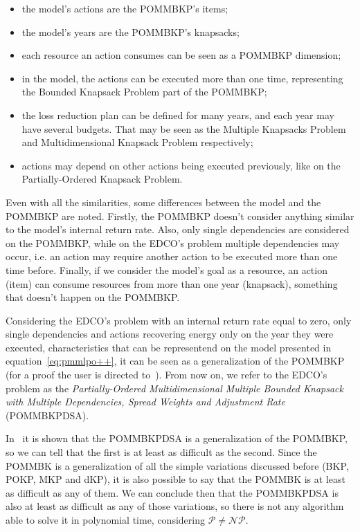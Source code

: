 \begin{itemize}
  \item the model's actions are the POMMBKP's items;
  \item the model's years are the POMMBKP's knapsacks;
  \item each resource an action consumes can be seen as a POMMBKP dimension;
  \item in the model, the actions can be executed more than one time, representing the Bounded Knapsack Problem part of the POMMBKP;
  \item the loss reduction plan can be defined for many years, and each year may have several budgets. That may be seen as the Multiple Knapsacks Problem and Multidimensional Knapsack Problem respectively;
  \item actions may depend on other actions being executed previously, like on the Partially-Ordered Knapsack Problem.
\end{itemize}

Even with all the similarities, some differences between the model and the POMMBKP are noted. Firstly, the 
POMMBKP doesn't consider anything similar to the model's internal return rate. Also, only single dependencies
are considered on the POMMBKP, while on the EDCO's problem multiple dependencies may occur, i.e. an action may require
another action to be executed more than one time before. Finally, if we consider the model's goal as a resource, 
an action (item) can consume resources from more than one year (knapsack), something that doesn't happen on the POMMBKP.

Considering the EDCO's problem with an internal return rate equal to zero, only single dependencies and actions recovering energy 
only on the year they were executed, characteristics that can be representend on the model presented in equation~\ref{eq:pmmlpo++}, 
it can be seen as a generalization of the POMMBKP (for a proof the user is directed to~\cite{Moreira2015}). From now on, we refer to 
the EDCO's problem as the \textit{Partially-Ordered Multidimensional Multiple Bounded Knapsack with Multiple Dependencies, 
Spread Weights and Adjustment Rate} (POMMBKPDSA).

In~\cite{Moreira2015} it is shown that the POMMBKPDSA is a generalization of the POMMBKP, so we can tell 
that the first is at least as difficult as the second. Since the POMMBK is a generalization of all the simple 
variations discussed before (BKP, POKP, MKP and dKP), it is also possible to say that the POMMBK is at least as 
difficult as any of them. We can conclude then that the POMMBKPDSA is also at least as difficult as any of those 
variations, so there is not any algorithm able to solve it in polynomial time, considering $\mathcal{P} \ne \mathcal{NP}$. 
